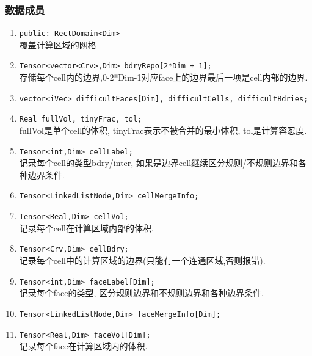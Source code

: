\documentclass[a4paper]{book}
\numberwithin{equation}{chapter}
\theoremstyle{definition}
\begin{document}
\subsubsection{数据成员}
\begin{enumerate}
  \item \texttt{public: RectDomain<Dim>} \\
  覆盖计算区域的网格

  \item \texttt{Tensor<vector<Crv>,Dim> bdryRepo[2*Dim + 1];} \\
        存储每个cell内的边界,0-2*Dim-1对应face上的边界最后一项是cell内部的边界.

  \item \texttt{vector<iVec> difficultFaces[Dim], difficultCells, difficultBdries;} \\

  \item \texttt{Real fullVol, tinyFrac, tol;} \\
  fullVol是单个cell的体积, tinyFrac表示不被合并的最小体积, tol是计算容忍度.

  \item \texttt{Tensor<int,Dim>     cellLabel;} \\
    记录每个cell的类型bdry/inter, 如果是边界cell继续区分规则/不规则边界和各种边界条件.  

    \item  \texttt{Tensor<LinkedListNode,Dim> cellMergeInfo;} \\
    
    \item \texttt{Tensor<Real,Dim> cellVol;} \\
    记录每个cell在计算区域内部的体积.

    \item \texttt{Tensor<Crv,Dim> cellBdry;} \\
    记录每个cell中的计算区域的边界(只能有一个连通区域,否则报错).

   \item \texttt{Tensor<int,Dim>     faceLabel[Dim];} \\ 
   记录每个face的类型, 区分规则边界和不规则边界和各种边界条件.

   \item \texttt{Tensor<LinkedListNode,Dim> faceMergeInfo[Dim];} \\
  
  \item \texttt{Tensor<Real,Dim>    faceVol[Dim];} \\
    记录每个face在计算区域内的体积.


\end{enumerate}
\end{document}
